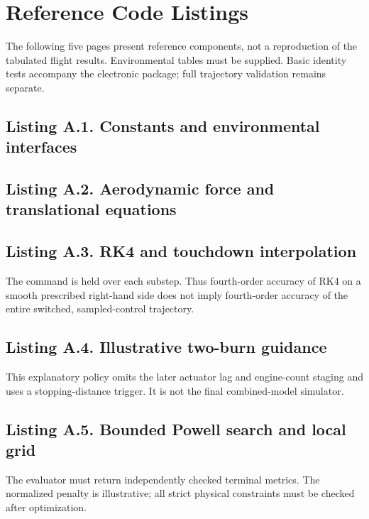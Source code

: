 \documentclass[11pt,a4paper]{article}
\begin{document}
\clearpage
\appendix
\section{Reference Code Listings}
\label{app:code}
\noindent The following five pages present reference components, not a reproduction of the tabulated flight results. Environmental tables must be supplied. Basic identity tests accompany the electronic package; full trajectory validation remains separate.
\subsection*{Listing A.1. Constants and environmental interfaces}

\clearpage
\subsection*{Listing A.2. Aerodynamic force and translational equations}

\clearpage
\subsection*{Listing A.3. RK4 and touchdown interpolation}

\noindent\small The command is held over each substep. Thus fourth-order accuracy of RK4 on a smooth prescribed right-hand side does not imply fourth-order accuracy of the entire switched, sampled-control trajectory.
\clearpage
\subsection*{Listing A.4. Illustrative two-burn guidance}

\noindent\small This explanatory policy omits the later actuator lag and engine-count staging and uses a stopping-distance trigger. It is not the final combined-model simulator.
\clearpage
\subsection*{Listing A.5. Bounded Powell search and local grid}

\noindent\small The evaluator must return independently checked terminal metrics. The normalized penalty is illustrative; all strict physical constraints must be checked after optimization.
\normalsize
\clearpage

\end{document}
